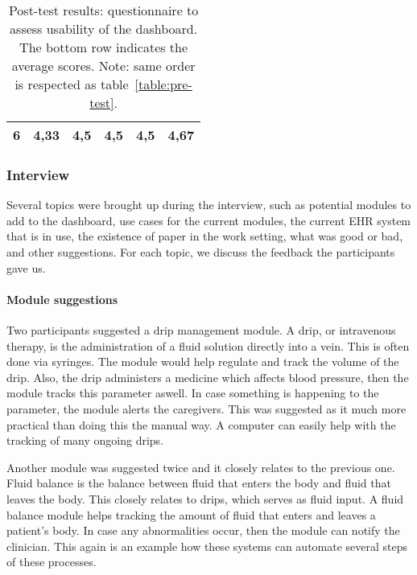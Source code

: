 \begin{table}[!t]
{\begin{tabular}{cccccc}
        \textbf{6}                                                                    & \textbf{4,33}                                                          & \textbf{4,5}                                                                  & \textbf{4,5}                                                                & \textbf{4,5}                                                                                       & \textbf{4,67}                                                                   \\ \hline
        \end{tabular}%
        }
        \caption{Post-test results: questionnaire to assess usability of the dashboard. The bottom row indicates the average scores. Note: same order is respected as table~\ref{table:pre-test}.}\label{table:post-test}
    \end{table}

    \subsubsection{Interview}

    Several topics were brought up during the interview, such as potential modules to add to the dashboard, use cases for the current modules, the current EHR system that is in use, the existence of paper in the work setting, what was good or bad, and other suggestions. For each topic, we discuss the feedback the participants gave us.

    \paragraph{Module suggestions} Two participants suggested a drip management module. A drip, or intravenous therapy, is the administration of a fluid solution directly into a vein. This is often done via syringes. The module would help regulate and track the volume of the drip. Also, the drip administers a medicine which affects blood pressure, then the module tracks this parameter aswell. In case something is happening to the parameter, the module alerts the caregivers. This was suggested as it much more practical than doing this the manual way. A computer can easily help with the tracking of many ongoing drips.

    Another module was suggested twice and it closely relates to the previous one. Fluid balance is the balance between fluid that enters the body and fluid that leaves the body. This closely relates to drips, which serves as fluid input. A fluid balance module helps tracking the amount of fluid that enters and leaves a patient's body. In case any abnormalities occur, then the module can notify the clinician. This again is an example how these systems can automate several steps of these processes.

